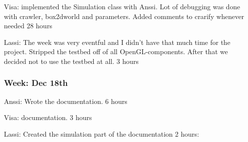 \documentclass{article}
\begin{document}
Visa:
implemented the Simulation class with Anssi. Lot of debugging was done with
crawler, box2dworld and parameters. Added comments to crarify whenever needed
28 hours

Lassi:
The week was very eventful and I didn't have that much time for the project.
Stripped the testbed off of all OpenGL-components. After that we decided not
to use the testbed at all.
3 hours

\subsubsection{Week: Dec 18th}
Anssi:
Wrote the documentation.
6 hours

Visa:
documentation.
3 hours

Lassi:
Created the simulation part of the documentation
2 hours:
\end{document}
